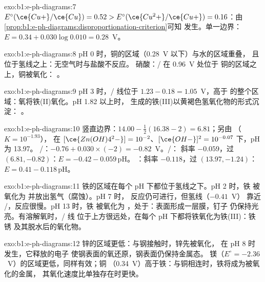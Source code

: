 \begin{solution}{exo:b1:e-ph-diagrams:7}
$E^\circ(\ce{Cu+}/\ce{Cu}) = 0.52 > E^\circ(\ce{Cu^2+}/\ce{Cu+}) = 0.16$：由
\cref{prop:b1:e-ph-diagrams:disproportionation-criterion}可知 
发生。单一边界：$E = 0.34 + 0.030\log 0.010 =
0.28$~V。
\end{solution}

\begin{solution}{exo:b1:e-ph-diagrams:8}
pH 0 时，铜的区域（0.28~V 以下）与水的区域重叠，
且位于氢线之上：无空气时与盐酸不反应。
硝酸：/ 在 0.96~V 处位于
铜的区域之上，铜被氧化：
。
\end{solution}

\begin{solution}{exo:b1:e-ph-diagrams:9}
pH 3 时，/ 线位于 $1.23 - 0.18 = 1.05$~V，高于
 的整个区域：氧将铁(II)氧化。pH 1.82 以上时，
生成的铁(III)以黄褐色氢氧化物的形式沉淀：
。
\end{solution}

\begin{solution}{exo:b1:e-ph-diagrams:10}
竖直边界：$14.00 - \frac12(16.38 - 2) = 6.81$；另由
（$K = 10^{-1.93}$），
在 $[\ce{Zn(OH)4^2-}] = 10^{-2}$、$[\ce{OH-}]^2 = 10^{-0.07}$ 下，pH 为 13.97。
/：$-0.76 + 0.030 \times (-2) = -0.82$~V。/：
斜率 $-0.059$，过 $(6.81, -0.82)$：$E = -0.42 - 0.059\,\mathrm{pH}$。
：斜率 $-0.118$，过
$(13.97, -1.24)$：$E = 0.41 - 0.118\,\mathrm{pH}$。
\end{solution}

\begin{solution}{exo:b1:e-ph-diagrams:11}
铁的区域在每个 pH 下都位于氢线之下。pH 2 时，铁
被氧化为  并放出氢气（腐蚀）。pH 7 时，
反应仍可进行，但氢线（$-0.41$~V）
靠近 /，反应很慢。pH 13 时，铁
被氧化为 ，处于：表面形成一层膜，钉子
仍保持光亮。有溶解氧时，/ 线
位于上方很远处，在每个 pH 下都将铁氧化为铁(III)：铁锈 
及其脱水后的氧化物。
\end{solution}

\begin{solution}{exo:b1:e-ph-diagrams:12}
锌的区域更低：与钢接触时，锌先被氧化，
 在 pH 8 时发生，它释放的电子
使钢表面的氧还原，钢表面仍保持金属态。
镁（$E^\circ = -2.36$~V）的区域更低，同样有效；铜
（0.34~V）高于铁：与铜相连时，铁将成为被氧化的金属，
其氧化速度比单独存在时更快。
\end{solution}

